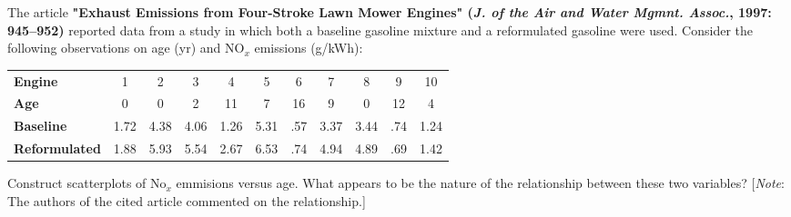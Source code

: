 \documentclass[11pt,letterpaper,boxed]{hmcpset}
\begin{document}


\begin{problem}[12.1.2]
	The article \textbf{"Exhaust Emissions from Four-Stroke Lawn Mower Engines" (\emph{J. of the Air and Water Mgmnt. Assoc.}, 1997: 945--952)} reported data from a study in which both a baseline gasoline mixture and a reformulated gasoline were used. Consider the following observations on age (yr) and NO$_x$ emissions (g/kWh):
	\begin{center}
	\begin{tabular}{l c c c c c c c c c c}
		\textbf{Engine} & 1 & 2 & 3 & 4 & 5 & 6 & 7 & 8 & 9 & 10\\
		\textbf{Age} & 0 & 0 & 2 & 11 & 7 & 16 & 9 & 0 & 12 & 4\\
		\textbf{Baseline} & 1.72 & 4.38 & 4.06 & 1.26 & 5.31 & .57 & 3.37 & 3.44 & .74 & 1.24\\
		\textbf{Reformulated} & 1.88 & 5.93 & 5.54 & 2.67 & 6.53 & .74 & 4.94 & 4.89 & .69 & 1.42
	\end{tabular}
	\end{center}
Construct scatterplots of No$_x$ emmisions versus age. What appears to be the nature of the relationship between these two variables? [\textit{Note}: The authors of the cited article commented on the relationship.]
\end{problem}

\begin{solution}
	\vfill
\end{solution}
\newpage

\end{document}
